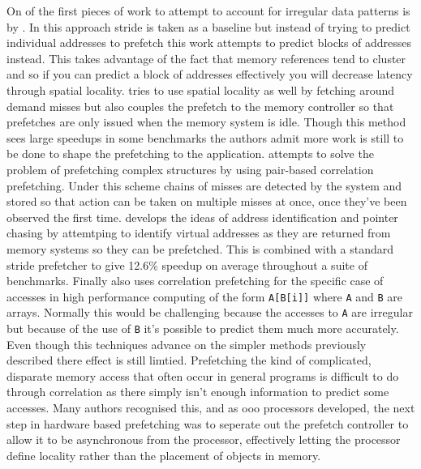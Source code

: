 On of the first pieces of work to attempt to account for irregular data patterns is by \citet{alexanderDistributedPrefetchbufferCache1996}. In this approach stride is taken as a baseline but instead of trying to predict individual addresses to prefetch this work attempts to predict blocks of addresses instead. This takes advantage of the fact that memory references tend to cluster and so if you can predict a block of addresses effectively you will decrease latency through spatial locality. \citet{linReducingDRAMLatencies2001} tries to use spatial locality as well by fetching around demand misses but also couples the prefetch to the memory controller so that prefetches are only issued when the memory system is idle. Though this method sees large speedups in some benchmarks the authors admit more work is still to be done to shape the prefetching to the application. \citet{solihinUsingUserlevelMemory2002} attempts to solve the problem of prefetching complex structures by using pair-based correlation prefetching. Under this scheme chains of misses are detected by the system and stored so that action can be taken on multiple misses at once, once they've been observed the first time. \citet{cookseyStatelessContentdirectedData2002a} develops the ideas of address identification and pointer chasing by attemtping to identify virtual addresses as they are returned from memory systems so they can be prefetched. This is combined with a standard stride prefetcher to give 12.6\% speedup on average throughout a suite of benchmarks. Finally \citet{yuIMPIndirectMemory2015} also uses correlation prefetching for the specific case of accesses in high performance computing of the form \texttt{A[B[i]]} where \texttt{A} and \texttt{B} are arrays. Normally this would be challenging because the accesses to \texttt{A} are irregular but because of the use of \texttt{B} it's possible to predict them much more accurately. Even though this techniques advance on the simpler methods previously described there effect is still limtied. Prefetching the kind of complicated, disparate memory access that often occur in general programs is difficult to do through correlation as there simply isn't enough information to predict some accesses. Many authors recognised this, and as \gls{ooo} processors developed, the next step in hardware based prefetching was to seperate out the prefetch controller to allow it to be asynchronous from the processor, effectively letting the processor define locality rather than the placement of objects in memory.

